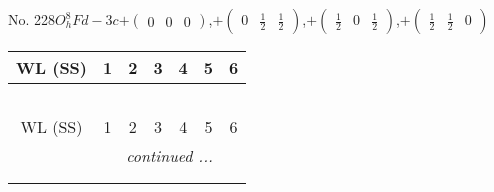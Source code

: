 \documentclass[fleqn,9pt,landscape]{jsarticle}
\begin{document}
\newpage
No. 228\quad$O_{h}^{8}$\quad$Fd-3c$\quad[ cubic ]\quad$+\begin{pmatrix} 0 & 0 & 0 \end{pmatrix}$,\quad $+\begin{pmatrix} 0 & \frac{1}{2} & \frac{1}{2} \end{pmatrix}$,\quad $+\begin{pmatrix} \frac{1}{2} & 0 & \frac{1}{2} \end{pmatrix}$,\quad $+\begin{pmatrix} \frac{1}{2} & \frac{1}{2} & 0 \end{pmatrix}$
\begin{center}
\renewcommand{\arraystretch}{1.2}
\begin{longtable}{ccccccc}
 \hline \hline
WL (SS) & 1 & 2 & 3 & 4 & 5 & 6 \\ \hline \endfirsthead

\multicolumn{6}{l}{\tablename\ \thetable{}} \\
 \hline \hline
WL (SS) & 1 & 2 & 3 & 4 & 5 & 6 \\ \hline \endhead

 \hline \hline
\multicolumn{6}{r}{\footnotesize\it continued ...} \\ \endfoot

 \hline \hline
\multicolumn{6}{r}{} \\ \endlastfoot


\end{longtable}
\end{center}
\end{document}
